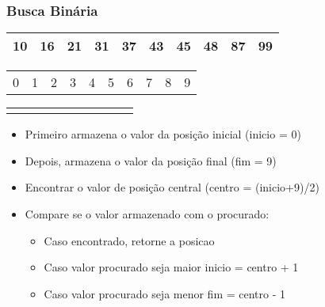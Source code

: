 \documentclass{beamer}
\begin{document}
\begin{frame}
    \frametitle{Busca Binária}
    \begin{center}
        \begin{table}
            \begin{tabular}{| p{0.25cm} | p{0.25cm} | p{0.25cm} | p{0.25cm} | p{0.25cm} | p{0.25cm} | p{0.25cm} | p{0.25cm} | p{0.25cm} | p{0.25cm} |}
                \hline
                10 & 16 & 21 & 31 & 37 & 43 & 45 & 48 & 87 & 99 \\ \hline
            \end{tabular}
            \begin{tabular}{p{0.25cm} p{0.25cm} p{0.25cm} p{0.25cm} p{0.25cm} p{0.25cm} p{0.25cm} p{0.25cm} p{0.25cm} p{0.25cm}}
                0 & 1 & 2 & 3 & 4 & 5 & 6 & 7 & 8 & 9
            \end{tabular}
            \begin{tabular}{p{0.25cm} p{0.25cm} p{0.25cm} p{0.25cm} p{0.25cm} p{0.25cm} p{0.25cm} p{0.25cm} p{0.25cm} p{0.25cm}}
                & & & & & & & & &
            \end{tabular}
        \end{table}
	\end{center}
    \begin{itemize}[<+->]
        \item Primeiro armazena o valor da posição inicial (inicio = 0)
        \item Depois, armazena o valor da posição final (fim = 9)
        \item Encontrar o valor de posição central (centro = (inicio+9)/2)
        \item Compare se o valor armazenado com o procurado:
            \begin{itemize}
                \item Caso encontrado, retorne a posicao
                \item Caso valor procurado seja maior inicio = centro + 1
                \item Caso valor procurado seja menor fim = centro - 1
            \end{itemize}
    \end{itemize}
\end{frame}
\end{document}
